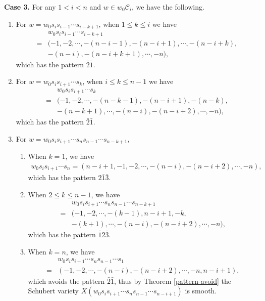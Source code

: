 \documentclass[11pt, reqno]{amsart}
\theoremstyle{definition}
\numberwithin{equation}{section}
\begin{document}
{\bf Case 3.} For any $1<i<n$ and $w\in w_0\mathcal{C}_i$, we have the following.
\begin{enumerate}
    \item For $w=w_0s_is_{i-1}\cdots s_{i-k+1}$, when $1\leq k\leq i$ we have
\begin{align*}
&w_0s_is_{i-1}\cdots s_{i-k+1}\\
=&(-1,-2,\cdots,-(n-i-1),-(n-i+1),\cdots,-(n-i+k),\\
&-(n-i),-(n-i+k+1),\cdots,-n),
\end{align*}
which has the pattern $\bar{2}\bar{1}$.

\item For $w=w_0s_is_{i+1}\cdots s_k$, when $i\leq k\leq n-1$ we have
\begin{align*}
&w_0s_is_{i+1}\cdots s_k\\
=&(-1,-2,\cdots,-(n-k-1),-(n-i+1),-(n-k),\\&-(n-k+1),\cdots,-(n-i),-(n-i+2),\cdots,-n),
\end{align*}
which has the pattern $\bar{2}\bar{1}$.

\item For $w=w_0s_is_{i+1}\cdots s_ns_{n-1}\cdots s_{n-k+1}$,
\begin{enumerate}
    \item When $k=1$, we have
    \begin{align*}
w_0s_is_{i+1}\cdots s_n=(n-i+1,-1,-2,\cdots,-(n-i),-(n-i+2),\cdots,-n),
\end{align*}
which has the pattern  $2\bar{1}\bar{3}$.

\item When $2\leq k\leq n-1$, we have
\begin{align*}
&w_0s_is_{i+1}\cdots s_ns_{n-1}\cdots s_{n-k+1}\\
=&(-1,-2,\cdots,-(k-1),n-i+1,-k,\\&-(k+1),\cdots,-(n-i),-(n-i+2),\cdots,-n),
\end{align*}
which has the pattern $\bar{1}2\bar{3}$.

\item When $k=n$, we have
\begin{align*}
&w_0s_is_{i+1}\cdots s_ns_{n-1}\cdots s_1\\
=&(-1,-2,\cdots,-(n-i),-(n-i+2),\cdots,-n,n-i+1),
\end{align*}
which avoids the pattern $\bar{2}\bar{1}$, thus by Theorem \ref{pattern-avoid} the Schubert variety $X(w_0s_is_{i+1}\cdots s_ns_{n-1}\cdots s_{n-i+1})$ is smooth.
    
\end{enumerate}



    
\end{enumerate}
\end{document}
